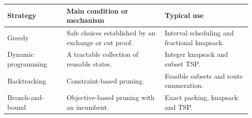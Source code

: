 \documentclass[12pt,a4paper]{article}
\begin{document}
\begin{tcolorbox}[tikzbox, title={Summary Comparison}]
\par\vspace{5pt}
\begingroup
\setlength{\extrarowheight}{1pt}
\noindent\begin{tabularx}{\linewidth}{|B{3.45cm}|Y|Y|}
\hline
\textbf{Strategy} & \textbf{Main condition or mechanism} & \textbf{Typical use} \\ \hline
Greedy & Safe choices established by an exchange or cut proof. & Interval scheduling and fractional knapsack. \\ \hline
Dynamic programming & A tractable collection of reusable states. & Integer knapsack and subset TSP. \\ \hline
Backtracking & Constraint-based pruning. & Feasible subsets and route enumeration. \\ \hline
Branch-and-bound & Objective-based pruning with an incumbent. & Exact packing, knapsack and TSP. \\ \hline
\end{tabularx}\par
\endgroup
\end{tcolorbox}
\end{document}
